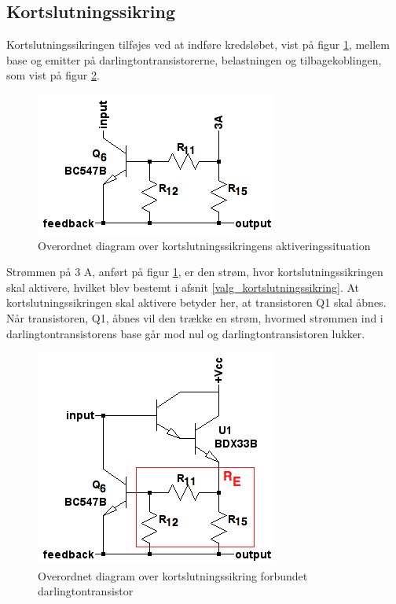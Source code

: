 \subsection{Kortslutningssikring}
\label{effekt_kortslutningssikring}
Kortslutningssikringen tilføjes ved at indføre kredsløbet, vist på figur \ref{fig:dia-kortslut}, mellem base og emitter på darlingtontransistorerne, belastningen og tilbagekoblingen, som vist på figur \ref{fig:dia-kortslut1}. 

\begin{figure}[h]
\centering
\includegraphics[scale=0.5]{teknisk/effektforstaerker/diagram-kortslut.png}
\caption{Overordnet diagram over kortslutningssikringens aktiveringssituation}
\label{fig:dia-kortslut}
\end{figure}

Strømmen på 3 A, anført på figur \ref{fig:dia-kortslut}, er den strøm, hvor kortslutningssikringen skal aktivere, hvilket blev bestemt i afsnit \ref{valg_kortslutningssikring}. At kortslutningssikringen skal aktivere betyder her, at transistoren Q1 skal åbnes. Når transistoren, Q1, åbnes vil den trække en strøm, hvormed strømmen ind i darlingtontransistorens base går mod nul og darlingtontransistoren lukker. 

\begin{figure}[h]
\centering
\includegraphics[scale=0.5]{teknisk/effektforstaerker/diagram-kortslut1.png}
\caption{Overordnet diagram over kortslutningssikring forbundet darlingtontransistor}
\label{fig:dia-kortslut1}
\end{figure}

